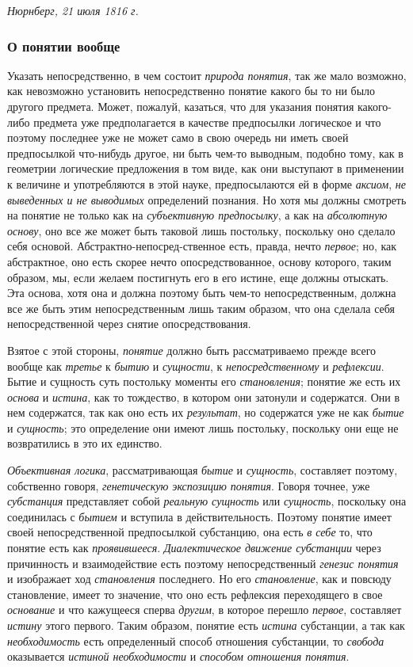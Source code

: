 \documentclass[twoside]{article}
\begin{document}
{\em Нюрнберг, 21 июля 1816 г.

\clearpage\subsubsection[О понятии вообще]{О понятии вообще}
Указать непосредственно, в чем состоит {\em природа понятия},
так же мало возможно, как невозможно установить
непосредственно понятие какого бы то ни было другого предмета. Может,
пожалуй, казаться, что для указания понятия какого-либо предмета уже
предполагается в качестве предпосылки логическое и что поэтому последнее
уже не может само в свою очередь ни иметь своей предпосылкой что-нибудь
другое, ни быть чем-то выводным, подобно тому, как в геометрии логические
предложения в том виде, как они выступают в применении к величине и
употребляются в этой науке, предпосылаются ей в форме
{\em аксиом}, {\em не выведенных и не выводимых} определений познания. 
Но хотя мы должны смотреть на понятие не только как на {\em субъективную 
предпосылку}, а как на {\em абсолютную основу}, оно все же может быть 
таковой лишь постольку, поскольку оно сделало себя основой. 
Абстрактно-непосред-ственное есть, правда, нечто {\em первое}; но, как
абстрактное, оно есть скорее нечто опосредствованное, основу которого,
таким образом, мы, если желаем постигнуть его в его истине, еще должны
отыскать. Эта основа, хотя она и должна поэтому быть чем-то
непосредственным, должна все же быть этим непосредственным лишь таким
образом, что она сделала себя непосредственной через снятие
опосредствования.

Взятое с этой стороны, {\em понятие} должно быть рассматриваемо прежде всего 
вообще как {\em третье} к {\em бытию} и {\em сущности}, к 
{\em непосредственному} и {\em рефлексии}. Бытие и сущность суть постольку 
моменты его {\em становления}; понятие же есть их {\em основа} и
{\em истина}, как то тождество, в котором они затонули и содержатся. Они в 
нем содержатся, так как оно есть их {\em результат}, но содержатся уже не 
как {\em бытие} и {\em сущность}; это определение они имеют лишь постольку, 
поскольку они еще не возвратились в это их единство.

{\em Объективная логика}, рассматривающая {\em бытие} и {\em сущность},
составляет поэтому, собственно говоря, {\em генетическую экспозицию понятия}.
Говоря точнее, уже {\em субстанция} представляет собой {\em реальную сущность}
или {\em сущность}, поскольку она соединилась с {\em бытием} и вступила в
действительность. Поэтому понятие имеет своей непосредственной предпосылкой
субстанцию, она есть {\em в себе} то, что понятие есть как {\em проявившееся}.
{\em Диалектическое движение субстанции} через причинность и взаимодействие 
есть поэтому непосредственный {\em генезис понятия} и изображает ход
{\em становления} последнего. Но его {\em становление}, как и
повсюду становление, имеет то значение, что оно есть рефлексия переходящего
в свое {\em основание} и что кажущееся сперва {\em другим}, в которое перешло
{\em первое}, составляет {\em истину} этого первого. Таким образом, понятие есть
{\em истина} субстанции, а так как {\em необходимость} есть определенный 
способ отношения субстанции, то {\em свобода} оказывается {\em истиной 
необходимости} и {\em способом отношения понятия}.

}
\end{document}

